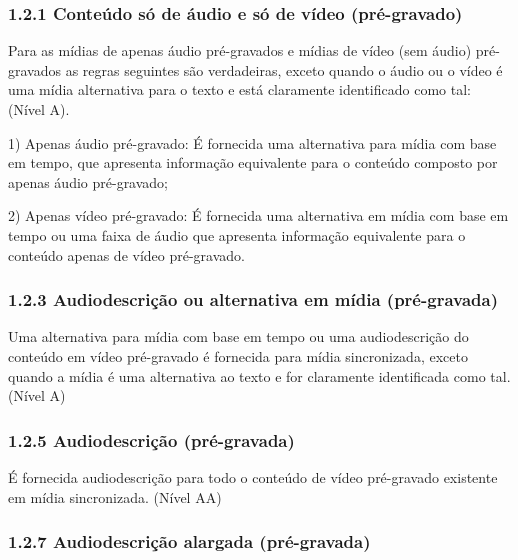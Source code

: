 \documentclass[a4paper]{article}
\begin{document}
\begin{titlepage}
\subsubsection{1.2.1 Conteúdo só de áudio e só de vídeo (pré-gravado)}

Para as mídias de apenas áudio pré-gravados e mídias de vídeo (sem áudio) pré-gravados as regras seguintes são verdadeiras, exceto quando o áudio ou o vídeo é uma mídia alternativa para o texto e está claramente identificado como tal: (Nível A).\\

\hspace{.1\textwidth} %
\begin{minipage}{.85\textwidth}
	1) Apenas áudio pré-gravado: É fornecida uma alternativa para mídia com base em tempo, que apresenta informação equivalente para o conteúdo composto por apenas áudio pré-gravado;\\
\end{minipage}

\hspace{.1\textwidth} %
\begin{minipage}{.85\textwidth}
	2) Apenas vídeo pré-gravado: É fornecida uma alternativa em mídia com base em tempo ou uma faixa de áudio que apresenta informação equivalente para o conteúdo apenas de vídeo pré-gravado.
\end{minipage}
\subsubsection{1.2.3 Audiodescrição ou alternativa em mídia (pré-gravada)}

Uma alternativa para mídia com base em tempo ou uma audiodescrição do conteúdo em vídeo pré-gravado é fornecida para mídia sincronizada, exceto quando a mídia é uma alternativa ao texto e for claramente identificada como tal. (Nível A)

\subsubsection{1.2.5 Audiodescrição (pré-gravada)}

É fornecida audiodescrição para todo o conteúdo de vídeo pré-gravado existente em mídia sincronizada. (Nível AA)

\subsubsection{1.2.7 Audiodescrição alargada (pré-gravada)}


\end{titlepage}
\end{document}

